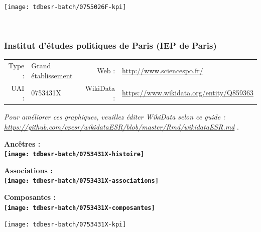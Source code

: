 \documentclass[12pt,french,]{article}
\begin{document}
\begin{center}\texttt{[image: tdbesr-batch/0755026F-kpi]} \end{center}\checkoddpage

\ifoddpage \fi ~\newpage  

\hypertarget{institut-duxe9tudes-politiques-de-paris-iep-de-paris}{%
\subsubsection{Institut d'études politiques de Paris (IEP de
Paris)}\label{institut-duxe9tudes-politiques-de-paris-iep-de-paris}}

\begin{tabular*}{\textwidth}{rp{5cm}rl}  
\hline  
Type : & Grand établissement & Web : &\href{http://www.sciencespo.fr/}{http://www.sciencespo.fr/} \\  
UAI : & 0753431X & WikiData : & \href{https://www.wikidata.org/entity/Q859363}{https://www.wikidata.org/entity/Q859363} \\  
\hline  
\end{tabular*}

\textit{\scriptsize Pour améliorer ces graphiques, veuillez éditer WikiData selon ce guide :  \href{https://github.com/cpesr/wikidataESR/blob/master/Rmd/wikidataESR.md}{https://github.com/cpesr/wikidataESR/blob/master/Rmd/wikidataESR.md}}
.

\vspace{1cm}  
\begin{minipage}[b]{0.50\textwidth}\begin{center} \bf Ancêtres : \\  
\texttt{[image: tdbesr-batch/0753431X-histoire]} \end{center}\end{minipage}\begin{minipage}[b]{0.50\textwidth}\begin{center} \bf Associations : \\  
\texttt{[image: tdbesr-batch/0753431X-associations]} \end{center}\end{minipage}

\hrulefill

\begin{center} \bf Composantes : \\  
\texttt{[image: tdbesr-batch/0753431X-composantes]} \end{center}

\begin{center}\texttt{[image: tdbesr-batch/0753431X-kpi]} \end{center}\checkoddpage
\end{document}
